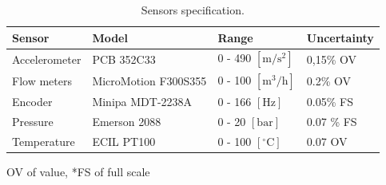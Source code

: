 \begin{table}[!ht]
  \begin{center}
    \caption{Sensors specification.} \label{tab.1b}
    \begin{threeparttable}
    \begin{tabular}{p{17mm}p{15mm}ll}
      \toprule
      Sensor & Model & Range & Uncertainty \\
      \midrule \midrule
      Accelerometer & PCB 352C33 &0 - 490 $\mathrm{[m/s^2]}$ & 0,15\% OV \\
      Flow meters & MicroMotion F300S355 & 0 - 100 $\mathrm{[m^3/h]}$ & 0.2\% OV \\
      Encoder & Minipa MDT-2238A & 0 - 166 $\mathrm{[Hz]}$ & 0.05\% FS \\
      Pressure & Emerson 2088 & 0 - 20 $\mathrm{[bar]}$   &  0.07 \% FS \\
      Temperature & ECIL PT100 & 0 - 100 $\mathrm{[^\circ C]}$ & 0.07 OV \\
      \bottomrule
    \end{tabular}  
    \begin{tablenotes}
      \item[]{\scriptsize *OV of value, *FS of full scale}
    \end{tablenotes}
  \end{threeparttable}
\end{center}
\end{table}

